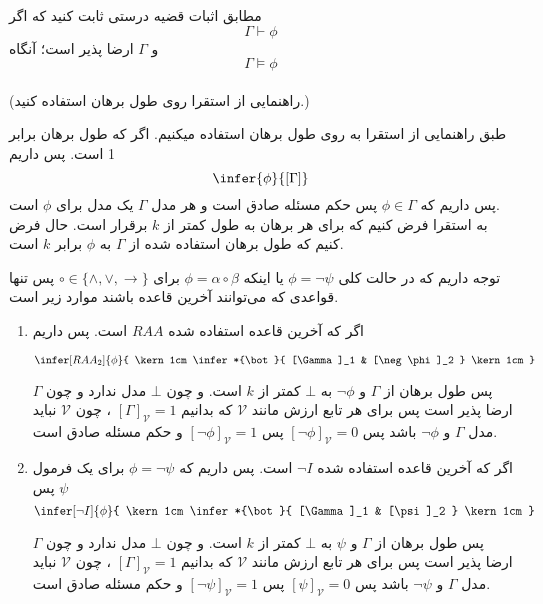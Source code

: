 	
	مطابق اثبات قضیه درستی ثابت کنید که اگر 
	$$\Gamma \vdash \phi$$
	و $\Gamma$ ارضا پذیر است؛ آنگاه
	$$\Gamma \vDash \phi$$\\
	(راهنمایی از استقرا روی طول برهان استفاده کنید.)
	
	\quad\vspace{0.5 cm}
	\begin {ans}
		طبق راهنمایی از استقرا به روی طول برهان استفاده میکنیم. 
		اگر که طول برهان برابر 1 است. پس داریم 
		$$
			\infer{\phi}{[\Gamma]}
		$$
		پس داریم که
		$\phi \in \Gamma$
	پس حکم مسئله صادق است و هر مدل
	 	$\Gamma$
	  یک مدل برای
	  	$\phi$
	    است.\\
		به استقرا فرض کنیم که برای هر برهان به طول کمتر از 
		$k$
		برقرار است. حال فرض کنیم که طول برهان استفاده شده از 
		$\Gamma$
		به 
		$\phi$
		برابر 
		$k$
		است. 
		
		
		توجه داریم که در حالت کلی
		$\phi = \neg \psi$
		یا اینکه 
		$\phi = \alpha \circ \beta$
		برای
		$\circ \in \{\wedge, \vee, \to\}$
		پس تنها قواعدی که می‌توانند آخرین قاعده باشند موارد زیر است.
		
		\quad\vspace {0.5 cm}
		\begin {enumerate}
			\item اگر که آخرین قاعده استفاده شده
			$RAA$ است. پس داریم 
			
			$$
				\infer[RAA_2]{\phi}{
					\kern 1cm	
					\infer*{\bot}{
						[\Gamma]_1
						&
						[\neg \phi]_2
					}
					\kern 1cm
				}
			$$
			
			پس طول برهان از 
			$\Gamma$ و $\neg \phi$
			به $\bot$ کمتر از $k$ است.
			و چون $\bot$ مدل ندارد و چون $\Gamma$ ارضا پذیر است پس برای هر تابع ارزش مانند $\mathcal {V}$ که بدانیم
			$[\Gamma]_\mathcal{V} = 1$ 
			، چون $\mathcal {V}$ نباید مدل $\Gamma$ و $\neg \phi$ باشد پس 
			$[\neg \phi]_\mathcal{V} = 0$
			پس 
			$[\neg \phi]_\mathcal{V} = 1$
			و حکم مسئله صادق است.
			
			
			
		\item 
		 اگر که آخرین قاعده استفاده شده
		$\neg I$ است. پس داریم 
		 که $\phi = \neg \psi$ 
		 برای یک فرمول
		  $\psi$
		   پس
		$$
		\infer[\neg I]{\phi}{
			\kern 1cm	
			\infer*{\bot}{
				[\Gamma]_1
				&
				[\psi]_2
			}
			\kern 1cm
		}
		$$
		
		پس طول برهان از 
		$\Gamma$ و $\psi$
		به $\bot$ کمتر از $k$ است.
		و چون $\bot$ مدل ندارد و چون $\Gamma$ ارضا پذیر است پس برای هر تابع ارزش مانند $\mathcal {V}$ که بدانیم
		$[\Gamma]_\mathcal{V} = 1$ 
		، چون $\mathcal {V}$ نباید مدل $\Gamma$ و $\neg \psi$ باشد پس 
		$[\psi]_\mathcal{V} = 0$
		پس 
		$[\neg \psi]_\mathcal{V} = 1$
		و حکم مسئله صادق است.
		

\end{enumerate}
\end{ans}
